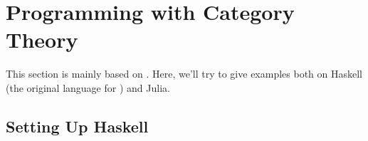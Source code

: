 \newpage
\section{Programming with Category Theory}

This section is mainly based on \citet{milewski2018category}.
Here, we'll try to give examples both on Haskell (the original language for \citet{milewski2018category})
and Julia.

\subsection{Setting Up Haskell}


